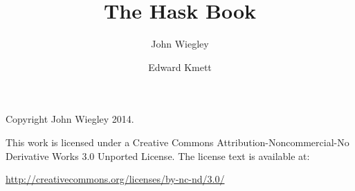 \documentclass[12pt]{report}
\title{The Hask Book}
\author{John Wiegley \and Edward Kmett}
\begin{document}
\setlength{\parskip}{0.5ex}
\maketitle

\thispagestyle{empty}
\mbox{}\vfill
\begin{center}

Copyright John Wiegley 2014.


This work is licensed under a
Creative Commons Attribution-Noncommercial-No Derivative Works 3.0
Unported License.
The license text is available at:

\end{center}

\begin{center} \url{http://creativecommons.org/licenses/by-nc-nd/3.0/} \end{center}

\tableofcontents



\clearpage
{}



\clearpage
{}
\printindex
\end{document}
